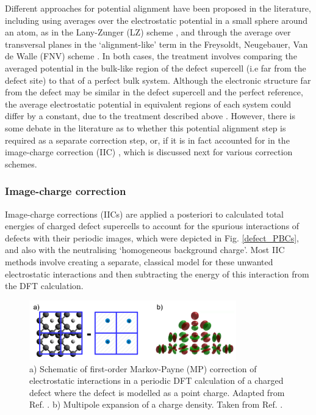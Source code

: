 \documentclass[11pt, twoside]{report}
\begin{document}
Different approaches for potential alignment have been proposed in the literature, including using averages over the electrostatic potential in a small sphere around an atom, as in the Lany-Zunger (LZ) scheme \cite{Lany_defects}, and through the average over transversal planes in the `alignment-like' term in the Freysoldt, Neugebauer, Van de Walle (FNV) scheme \cite{FNV, kumagai_oba}. In both cases, the treatment involves comparing the averaged potential in the bulk-like region of the defect supercell (i.e far from the defect site) to that of a perfect bulk system. Although the electronic structure far from the defect may be similar in the defect supercell and the perfect reference, the average electrostatic potential in equivalent regions of each system could differ by a constant, due to the treatment described above \cite{komsa}. 
However, there is some debate in the literature as to whether this potential alignment step is required as a separate correction step, or, if it is in fact accounted for in the image-charge correction (IIC) \cite{kumagai_oba}, which is discussed next for various correction schemes. 


\subsubsection{Image-charge correction}
Image-charge corrections (IICs) are applied a posteriori to calculated total energies of charged defect supercells to account for the spurious interactions of defects with their periodic images, which were depicted in Fig. \ref{defect_PBCs}, and also with the neutralising `homogeneous background charge'. Most IIC methods involve creating a separate, classical model for these unwanted electrostatic interactions and then subtracting the energy of this interaction from the DFT calculation.

\begin{figure}[h!]
  \centering
    \includegraphics[width=0.8\textwidth]{figures/IIC.png}
    \caption{a) Schematic of first-order Markov-Payne (MP) correction of electrostatic interactions in a periodic DFT calculation of a charged defect where the defect is modelled as a point charge. Adapted from Ref. . b) Multipole expansion of a charge density. Taken from Ref. .}
  \label{IIC}
\end{figure}
\end{document}
